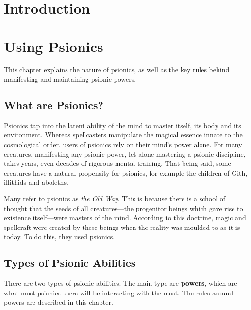 



\frontmatter
\maketitle
\tableofcontents

\mainmatter%

\chapter{Introduction}


\chapter{Using Psionics}

This chapter explains the nature of psionics,
as well as the key rules behind
manifesting and maintaining psionic powers.

\section{What are Psionics?}
Psionics tap into the latent ability of the mind
to master itself, its body and its environment.
Whereas spellcasters manipulate the magical essence
innate to the cosmological order,
users of psionics rely on their mind's power alone.
For many creatures,
manifesting any psionic power,
let alone mastering a psionic discipline,
takes years, even decades of rigorous mental training.
That being said,
some creatures have a natural propensity for psionics,
for example the children of Gith, illithids and aboleths.

Many refer to psionics as \emph{the Old Way}.
This is because there is a school of thought that
the seeds of all creatures---the progenitor beings
which gave rise to existence itself---were
masters of the mind.
According to this doctrine,
magic and spellcraft were created by these
beings when the reality was moulded to as it is today.
To do this, they used psionics.

\section{Types of Psionic Abilities}
There are two types of psionic abilities.
The main type are \textbf{powers},
which are what most psionics users will be
interacting with the most.
The rules around powers are described in this chapter.

